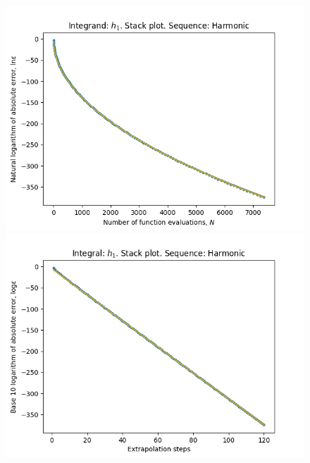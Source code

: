\begin{figure}[H]
\centering
\begin{minipage}{0.45\textwidth}
\centering
\includegraphics[scale=0.45]{../results/romberg_plots/h_one_hp_harmonic_stack.png}
\end{minipage}
\begin{minipage}{0.45\textwidth}
\centering
\includegraphics[scale=0.45]{../results/romberg_plots/h_one_hp_harmonic_steps_stack.png}
\end{minipage}
\end{figure}

